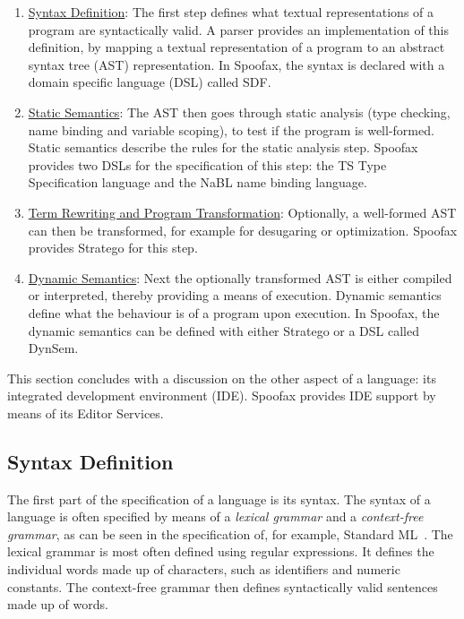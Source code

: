\begin{enumerate}
\item \hyperref[ssec:syntax-def]{Syntax Definition}: The first step defines what textual
representations of a program are syntactically valid. A parser
provides an implementation of this definition, by mapping a textual
representation of a program to an abstract syntax tree (AST)
representation. In Spoofax, the syntax is declared with a domain
specific language (DSL) called SDF.
\item \hyperref[ssec:static-analysis]{Static Semantics}: The AST then goes through static analysis (type
checking, name binding and variable scoping), to test if the
program is well-formed. Static semantics describe the rules for the
static analysis step. Spoofax provides two DSLs for the
specification of this step: the TS Type Specification language and
the NaBL name binding language.
\item \hyperref[ssec:term-rewrite]{Term Rewriting and Program Transformation}: Optionally, a
well-formed AST can then be transformed, for example for desugaring
or optimization. Spoofax provides Stratego for this step.
\item \hyperref[ssec:dynamic-semantics]{Dynamic Semantics}: Next the optionally transformed AST is either
compiled or interpreted, thereby providing a means of
execution. Dynamic semantics define what the behaviour is of a
program upon execution. In Spoofax, the dynamic semantics can be
defined with either Stratego or a DSL called DynSem.
\end{enumerate}

This section concludes with a discussion on the other
aspect of a language: its integrated development environment
(IDE). Spoofax provides IDE support by means of its Editor Services.

\subsection{Syntax Definition}
\label{ssec:syntax-def}
The first part of the specification of a language is its syntax. The
syntax of a language is often specified by means of a \emph{lexical
grammar} and a \emph{context-free grammar}, as can be seen in the
specification of, for example, Standard ML~\cite{Milner97}. The
lexical grammar is most often defined using regular expressions. It
defines the individual words made up of characters, such as
identifiers and numeric constants. The context-free grammar then
defines syntactically valid sentences made up of words.

